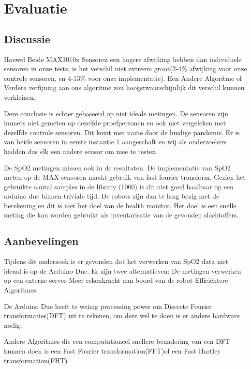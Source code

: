 \documentclass[11pt]{article}
\begin{document}
	
    \section{Evaluatie}\label{sec:evaluatie}
    \subsection{Discussie}\label{subsec:discussie}

Hoewel Beide MAX3010x Sensoren een hogere afwijking hebben dan individuele sensoren in onze tests, is het verschil niet extreem groot(2-4\% afwijking voor onze controle sensoren, en 4-13\% voor onze implementatie). Een Andere Algoritme of Verdere verfijning aan ons algoritme zou hoogstwaarschijnlijk dit verschil kunnen verkleinen.

Deze conclusie is echter gebaseerd op niet ideale metingen. De sensoren zijn immers niet gemeten op dezelfde proefpersonen en ook niet vergeleken met dezelfde controle sensoren. Dit komt met name door de huidige pandemie. Er is van beide sensoren in eerste instantie 1 aangeschaft en wij als onderzoekers hadden dus elk een andere sensor om mee te testen.

De SpO2 metingen missen ook in de resultaten. De implementatie van SpO2 meten op de MAX sensoren maakt gebruik van fast fourier transform. 
Gezien het gebruikte aantal samples in de library (1000) is dit niet goed haalbaar op een arduino due binnen triviale tijd. De robots zijn dan te lang bezig met de berekening en dit is niet het doel van de health monitor. Het doel is een snelle meting die kan worden gebruikt als inventarisatie van de gevonden slachtoffers. 





    \subsection{Aanbevelingen}\label{subsec:aanbevelingen}
Tijdens dit onderzoek is er gevonden dat het verwerken van SpO2 data niet ideaal is op de Arduino Due. Er zijn twee alternatieven:
De metingen verwerken op een externe server
Meer rekenkracht aan boord van de robot
Efficiëntere Algoritmes

De Arduino Due heeft te weinig processing power om Discrete Fourier transformaties(DFT) uit te rekenen, om deze wel te doen is er andere hardware nodig.

Andere Algoritmes die een computationeel snellere benadering van een DFT kunnen doen is een Fast Fourier transformation(FFT)of een Fast Hartley transformation(FHT) 
\end{document}
